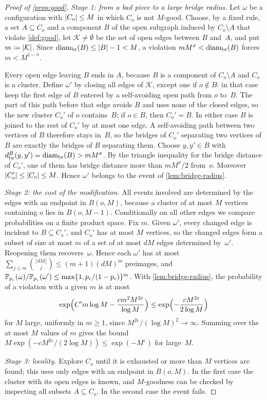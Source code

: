 \begin{proof}[Proof of \cref{prop:good}]
\emph{Stage 1: from a bad piece to a large bridge radius.} Let $\omega$ be a configuration with
$\lvert C_o\rvert\le M$ in which $C_o$ is not $M$-good. Choose, by a fixed rule, a set $A\subseteq C_o$ and a
component $B$ of the open subgraph induced by $C_o\setminus A$ that violate \cref{def:good}, let
$\mathcal K\neq\emptyset$ be the set of open edges between $B$ and~$A$, and put $m\coloneqq\lvert\mathcal K\rvert$. Since $\operatorname{diam}_{\mathrm{br}}(B)\le\lvert B\rvert-1<M$, a violation
$mM^\sigma<\operatorname{diam}_{\mathrm{br}}(B)$ forces $m<M^{1-\sigma}$.

Every open edge leaving $B$ ends in $A$, because $B$ is a component of $C_o\setminus A$ and $C_o$ is a
cluster. Define $\omega'$ by closing all edges of $\mathcal K$, except one if $o\notin B$:
in that case keep the first edge of $B$ entered by a self-avoiding open path from $o$ to~$B$. The part
of this path before that edge avoids $B$ and uses none of the closed edges, so the new cluster $C_o'$
of $o$ contains~$B$; if $o\in B$, then $C_o'=B$. In either case $B$ is joined to the rest of $C_o'$ by
at most one edge. A self-avoiding path between two vertices of $B$ therefore stays in~$B$, so the
bridges of $C_o'$ separating two vertices of $B$ are exactly the bridges of $B$ separating them.
Choose $y,y'\in B$ with $d_{\mathrm{br}}^B(y,y')=\operatorname{diam}_{\mathrm{br}}(B)>mM^\sigma$. By the triangle inequality for the bridge
distance of $C_o'$, one of them has bridge distance more than $mM^\sigma/2$ from~$o$. Moreover
$\lvert C_o'\rvert\le\lvert C_o\rvert\le M$. Hence $\omega'$ belongs to the event of \cref{lem:bridge-radius}.

\emph{Stage 2: the cost of the modification.} All events involved are determined by the edges with an
endpoint in $B(o,M)$, because a cluster of at most $M$ vertices containing $o$ lies in $B(o,M-1)$.
Conditionally on all other edges we compare probabilities on a finite product space. Fix $m$. Given
$\omega'$, every changed edge is incident to $B\subseteq C_o'$, and $C_o'$ has at most $M$ vertices, so
the changed edges form a subset of size at most $m$ of a set of at most $dM$ edges determined
by~$\omega'$. Reopening them recovers~$\omega$. Hence each $\omega'$ has at most
$\sum_{j\le m}\binom{\lfloor dM\rfloor}{j}\le(m+1)(dM)^m$ preimages, and
$\mathbb P_{p_c}(\omega)/\mathbb P_{p_c}(\omega')\le\max\{1,p_c/(1-p_c)\}^m$. With \cref{lem:bridge-radius}, the
probability of a violation with a given $m$ is at most
\begin{equation*}
  \exp\Bigl(C'm\log M-\frac{cm^2M^{2\varepsilon}}{\log M}\Bigr)
  \le\exp\Bigl(-\frac{cM^{2\varepsilon}}{2\log M}\Bigr)
\end{equation*}
for $M$ large, uniformly in $m\ge1$, since $M^{2\varepsilon}/(\log M)^2\to\infty$. Summing over the at
most $M$ values of $m$ gives the bound $M\exp(-cM^{2\varepsilon}/(2\log M))\le\exp(-M^\varepsilon)$ for
large~$M$.

\emph{Stage 3: locality.} Explore $C_o$ until it is exhausted or more than $M$ vertices are found; this
uses only edges with an endpoint in $B(o,M)$. In the first case the cluster with its open edges is
known, and $M$-goodness can be checked by inspecting all subsets $A\subseteq C_o$. In the second case
the event fails.
\end{proof}
